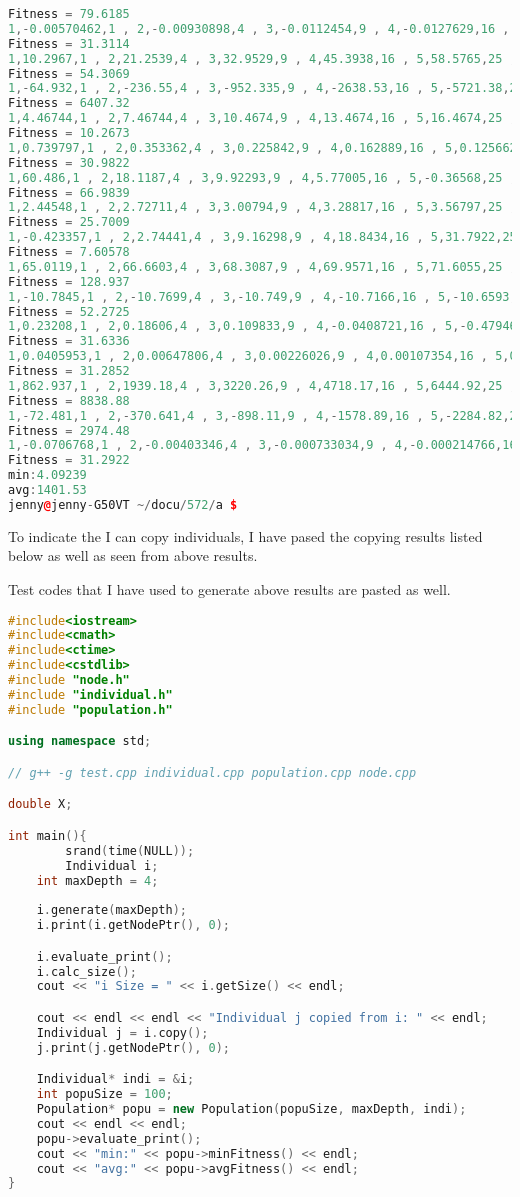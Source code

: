 \documentclass[10pt,b5paper]{article}
\begin{document}
\begin{lstlisting}[language=c++]
Fitness = 79.6185
1,-0.00570462,1 , 2,-0.00930898,4 , 3,-0.0112454,9 , 4,-0.0127629,16 , 5,-0.0141113,25 , 
Fitness = 31.3114
1,10.2967,1 , 2,21.2539,4 , 3,32.9529,9 , 4,45.3938,16 , 5,58.5765,25 , 
Fitness = 54.3069
1,-64.932,1 , 2,-236.55,4 , 3,-952.335,9 , 4,-2638.53,16 , 5,-5721.38,25 , 
Fitness = 6407.32
1,4.46744,1 , 2,7.46744,4 , 3,10.4674,9 , 4,13.4674,16 , 5,16.4674,25 , 
Fitness = 10.2673
1,0.739797,1 , 2,0.353362,4 , 3,0.225842,9 , 4,0.162889,16 , 5,0.125662,25 , 
Fitness = 30.9822
1,60.486,1 , 2,18.1187,4 , 3,9.92293,9 , 4,5.77005,16 , 5,-0.36568,25 , 
Fitness = 66.9839
1,2.44548,1 , 2,2.72711,4 , 3,3.00794,9 , 4,3.28817,16 , 5,3.56797,25 , 
Fitness = 25.7009
1,-0.423357,1 , 2,2.74441,4 , 3,9.16298,9 , 4,18.8434,16 , 5,31.7922,25 , 
Fitness = 7.60578
1,65.0119,1 , 2,66.6603,4 , 3,68.3087,9 , 4,69.9571,16 , 5,71.6055,25 , 
Fitness = 128.937
1,-10.7845,1 , 2,-10.7699,4 , 3,-10.749,9 , 4,-10.7166,16 , 5,-10.6593,25 , 
Fitness = 52.2725
1,0.23208,1 , 2,0.18606,4 , 3,0.109833,9 , 4,-0.0408721,16 , 5,-0.479462,25 , 
Fitness = 31.6336
1,0.0405953,1 , 2,0.00647806,4 , 3,0.00226026,9 , 4,0.00107354,16 , 5,0.000601693,25 , 
Fitness = 31.2852
1,862.937,1 , 2,1939.18,4 , 3,3220.26,9 , 4,4718.17,16 , 5,6444.92,25 , 
Fitness = 8838.88
1,-72.481,1 , 2,-370.641,4 , 3,-898.11,9 , 4,-1578.89,16 , 5,-2284.82,25 , 
Fitness = 2974.48
1,-0.0706768,1 , 2,-0.00403346,4 , 3,-0.000733034,9 , 4,-0.000214766,16 , 5,-8.19048e-05,25 , 
Fitness = 31.2922
min:4.09239
avg:1401.53
jenny@jenny-G50VT ~/docu/572/a $ 
\end{lstlisting}

To indicate the I can copy individuals, I have pased the copying results listed below as well as seen from above results. 

Test codes that I have used to generate above results are pasted as well. 
\begin{lstlisting}[language=c++]
#include<iostream>
#include<cmath>
#include<ctime>
#include<cstdlib>
#include "node.h"
#include "individual.h"
#include "population.h"

using namespace std;

// g++ -g test.cpp individual.cpp population.cpp node.cpp

double X;

int main(){
        srand(time(NULL));
        Individual i;
    int maxDepth = 4;
    
    i.generate(maxDepth);
    i.print(i.getNodePtr(), 0);

    i.evaluate_print();
    i.calc_size();
    cout << "i Size = " << i.getSize() << endl;

    cout << endl << endl << "Individual j copied from i: " << endl;
    Individual j = i.copy();
    j.print(j.getNodePtr(), 0);

    Individual* indi = &i;
    int popuSize = 100;
    Population* popu = new Population(popuSize, maxDepth, indi);
    cout << endl << endl;
    popu->evaluate_print();
    cout << "min:" << popu->minFitness() << endl;
    cout << "avg:" << popu->avgFitness() << endl;
}
\end{lstlisting}
\end{document}
